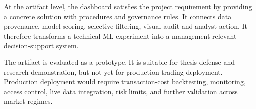 At the artifact level, the dashboard satisfies the project requirement by providing a concrete solution with procedures and governance rules. It connects data provenance, model scoring, selective filtering, visual audit and analyst action. It therefore transforms a technical ML experiment into a management-relevant decision-support system.

The artifact is evaluated as a prototype. It is suitable for thesis defense and research demonstration, but not yet for production trading deployment. Production deployment would require transaction-cost backtesting, monitoring, access control, live data integration, risk limits, and further validation across market regimes.

